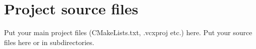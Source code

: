 \chapter{Project source files}
\hypertarget{md__d_1_2_vojta_2_programovani_2_____cpp-zaklady_2venzarv_2project_2src_2_r_e_a_d_m_e}{}\label{md__d_1_2_vojta_2_programovani_2_____cpp-zaklady_2venzarv_2project_2src_2_r_e_a_d_m_e}
\label{md__d_1_2_vojta_2_programovani_2_____cpp-zaklady_2venzarv_2project_2src_2_r_e_a_d_m_e_autotoc_md0}%
%
 Put your main project files ({\ttfamily CMake\+Lists.\+txt}, {\ttfamily .vcxproj} etc.) here. Put your source files here or in subdirectories. 